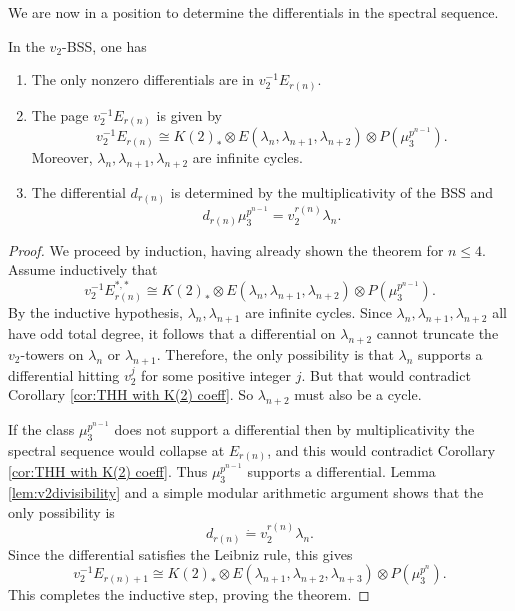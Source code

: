 We are now in a position to determine the differentials in the spectral sequence. 

\begin{thm}\label{key to proof}
In the $v_2$-BSS, one has 
\begin{enumerate}
	\item The only nonzero differentials are in $v_2^{-1}E_{r(n)}$.
	\item The page $v_2^{-1}E_{r(n)}$ is given by 
	\[
	v_2^{-1}E_{r(n)}\cong K(2)_*\otimes E(\lambda_n, \lambda_{n+1}, \lambda_{n+2})\otimes P(\mu_3^{p^{n-1}}). 
	\]
	Moreover, $\lambda_n, \lambda_{n+1},\lambda_{n+2}$ are infinite cycles. 
	
	\item The differential $d_{r(n)}$ is determined by the multiplicativity of the BSS and 
	\[
	d_{r(n)}\mu_3^{p^{n-1}}=v_2^{r(n)}\lambda_n. 
	\]
\end{enumerate}	
\end{thm}
\begin{proof}
	We proceed by induction, having already shown the theorem for $n\leq 4$. Assume inductively that 
	\[
	v_2^{-1}E_{r(n)}^{*,*}\cong K(2)_*\otimes E(\lambda_n, \lambda_{n+1}, \lambda_{n+2})\otimes P(\mu_3^{p^{n-1}}).
	\] 
	By the inductive hypothesis, $\lambda_n, \lambda_{n+1}$ are infinite cycles. Since $\lambda_n, \lambda_{n+1}, \lambda_{n+2}$ all have odd total degree, it follows that a differential on $\lambda_{n+2}$ cannot truncate the $v_2$-towers on $\lambda_n$ or $\lambda_{n+1}$. Therefore, the only possibility is that $\lambda_n$ supports a differential hitting $v_2^j$ for some positive integer $j$. 
	But that would contradict Corollary \ref{cor:THH with K(2) coeff}. So $\lambda_{n+2}$ must also be a cycle.
	
	If the class $\mu_3^{p^{n-1}}$ does not support a differential then by multiplicativity the spectral sequence would collapse at $E_{r(n)}$, and this would contradict Corollary \ref{cor:THH with K(2) coeff}. Thus $\mu_3^{p^{n-1}}$ supports a differential. Lemma \ref{lem:v2divisibility} and a simple modular arithmetic argument shows that the only possibility is 
	\[
	d_{r(n)}\dot{=}v_2^{r(n)}\lambda_n.
	\]
	Since the differential satisfies the Leibniz rule, this gives
	\[
	v_2^{-1}E_{r(n)+1}\cong K(2)_*\otimes E(\lambda_{n+1},\lambda_{n+2}, \lambda_{n+3})\otimes P(\mu_{3}^{p^n}).
	\]
	This completes the inductive step, proving the theorem.
\end{proof}


